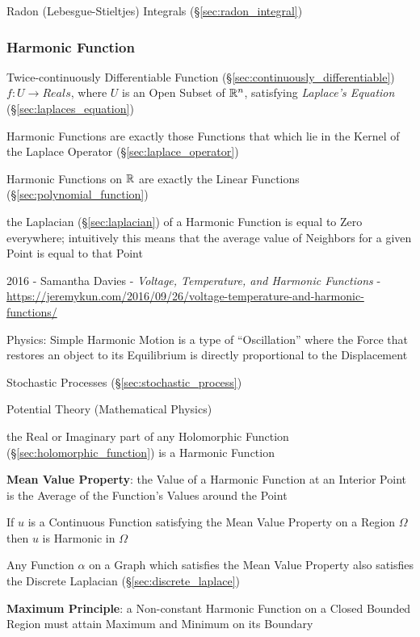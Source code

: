 Radon (Lebesgue-Stieltjes) Integrals (\S\ref{sec:radon_integral})



\subsubsection{Harmonic Function}\label{sec:harmonic_function}

Twice-continuously Differentiable Function
(\S\ref{sec:continuously_differentiable}) $f : U \rightarrow Reals$,
where $U$ is an Open Subset of $\mathbb{R}^n$, satisfying \emph{Laplace's
  Equation} (\S\ref{sec:laplaces_equation})

Harmonic Functions are exactly those Functions that which lie in the Kernel of
the Laplace Operator (\S\ref{sec:laplace_operator})

Harmonic Functions on $\mathbb{R}$ are exactly the Linear Functions
(\S\ref{sec:polynomial_function})

the Laplacian (\S\ref{sec:laplacian}) of a Harmonic Function is equal to Zero
everywhere; intuitively this means that the average value of Neighbors for a
given Point is equal to that Point

2016 - Samantha Davies - \emph{Voltage, Temperature, and Harmonic
  Functions} -
\url{https://jeremykun.com/2016/09/26/voltage-temperature-and-harmonic-functions/}

Physics: Simple Harmonic Motion is a type of ``Oscillation'' where the
Force that restores an object to its Equilibrium is directly
proportional to the Displacement

Stochastic Processes (\S\ref{sec:stochastic_process})

Potential Theory (Mathematical Physics) %

the Real or Imaginary part of any Holomorphic Function
(\S\ref{sec:holomorphic_function}) is a Harmonic Function


\textbf{Mean Value Property}: the Value of a Harmonic Function at an
Interior Point is the Average of the Function's Values around the
Point

If $u$ is a Continuous Function satisfying the Mean Value Property on
a Region $\Omega$ then $u$ is Harmonic in $\Omega$

Any Function $\alpha$ on a Graph which satisfies the Mean Value
Property also satisfies the Discrete Laplacian
(\S\ref{sec:discrete_laplace})


\textbf{Maximum Principle}: a Non-constant Harmonic Function on a
Closed Bounded Region must attain Maximum and Minimum on its Boundary

